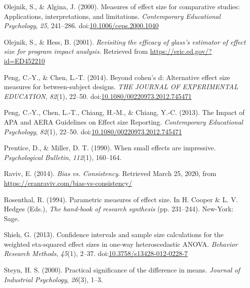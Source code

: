 \documentclass[
  man]{apa6}
\begin{document}
\leavevmode\hypertarget{ref-Olejnik_Algina_2000}{}%
Olejnik, S., \& Algina, J. (2000). Measures of effect size for comparative studies: Applications, interpretations, and limitations. \emph{Contemporary Educational Psychology}, \emph{25}, 241--286. doi:\href{https://doi.org/10.1006/ceps.2000.1040}{10.1006/ceps.2000.1040}

\leavevmode\hypertarget{ref-Olejnik_Hess_2001}{}%
Olejnik, S., \& Hess, B. (2001). \emph{Revisiting the efficacy of glass's estimator of effect size for program impact analysis}. Retrieved from \url{https://eric.ed.gov/?id=ED452210}

\leavevmode\hypertarget{ref-Peng_and_Chen_2014}{}%
Peng, C.-Y., \& Chen, L.-T. (2014). Beyond cohen's d: Alternative effect size measures for between-subject designs. \emph{THE JOURNAL OF EXPERIMENTAL EDUCATION}, \emph{82}(1), 22--50. doi:\href{https://doi.org/10.1080/00220973.2012.745471}{10.1080/00220973.2012.745471}

\leavevmode\hypertarget{ref-Peng_et_al_2013}{}%
Peng, C.-Y., Chen, L.-T., Chiang, H.-M., \& Chiang, Y.-C. (2013). The Impact of APA and AERA Guidelines on Effect size Reporting. \emph{Contemporary Educational Psychology}, \emph{82}(1), 22--50. doi:\href{https://doi.org/10.1080/00220973.2012.745471}{10.1080/00220973.2012.745471}

\leavevmode\hypertarget{ref-Prentice_Miller_1992}{}%
Prentice, D., \& Miller, D. T. (1990). When small effects are impressive. \emph{Psychological Bulletin}, \emph{112}(1), 160--164.

\leavevmode\hypertarget{ref-Raviv}{}%
Raviv, E. (2014). \emph{Bias vs. Consistency}. Retrieved March 25, 2020, from \url{https://eranraviv.com/bias-vs-consistency/}

\leavevmode\hypertarget{ref-Rosenthal_1994}{}%
Rosenthal, R. (1994). Parametric measures of effect size. In H. Cooper \& L. V. Hedges (Eds.), \emph{The hand-book of research synthesis} (pp. 231--244). New-York: Sage.

\leavevmode\hypertarget{ref-Shieh_2013}{}%
Shieh, G. (2013). Confidence intervals and sample size calculations for the weighted eta-squared effect sizes in one-way heteroscedastic ANOVA. \emph{Behavior Research Methods}, \emph{45}(1), 2--37. doi:\href{https://doi.org/10.3758/s13428-012-0228-7}{10.3758/s13428-012-0228-7}

\leavevmode\hypertarget{ref-Steyn_2000}{}%
Steyn, H. S. (2000). Practical significance of the difference in means. \emph{Journal of Industrial Psychology}, \emph{26}(3), 1--3.
\end{document}
